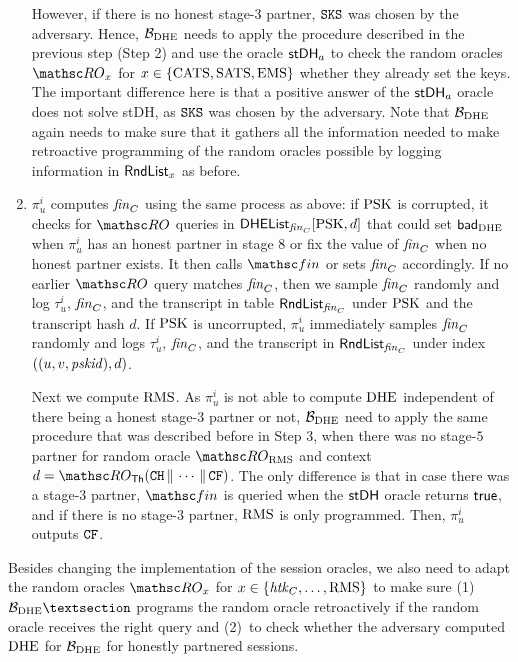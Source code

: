 \begin{enumerate}
		However, if there is no honest stage-$3$ partner, $\mathtt{SKS}$ was chosen by the adversary.
		Hence, $\mathcal{B}_{\mathrm{DHE}}$ needs to apply the procedure described in the previous step (Step 2) and use the oracle $\mathsf{stDH}_a$ to check the random oracles $\RO_{x}$ for $x \in \{\mathrm{CATS}, \mathrm{SATS}, \mathrm{EMS}\}$ whether they already set the keys.
		The important difference here is that a positive answer of the $\mathsf{stDH}_a$ oracle does not solve stDH,
		as $\mathtt{SKS}$ was chosen by the adversary.
		Note that $\mathcal{B}_{\mathrm{DHE}}$ again needs to make sure that it gathers all the information needed to make retroactive programming of the random oracles possible by logging information in $\mathsf{RndList}_{x}$ as before.
		\item $\pi_u^i$ computes $\mathit{fin}_C$ using the same process as above: if $\mathrm{PSK}$ is corrupted, it checks for $\RO$ queries in $\mathsf{DHEList}_{\mathit{fin}_C}[\mathrm{PSK}, d]$ that could set $\mathsf{bad}_{\mathrm{DHE}}$ when $\pi_u^i$ has an honest partner in stage $8$ or fix the value of $\mathit{fin}_C$ when no honest partner exists.
		It then calls $\Finalize$ or sets $\mathit{fin}_C$ accordingly.
		If no earlier $\RO$ query matches $\mathit{fin}_C$, then we sample $\mathit{fin}_C$ randomly and log $\tau_u^i$, $\mathit{fin}_C$, and the transcript in table $\mathsf{RndList}_{\mathit{fin}_C}$ under $\mathrm{PSK}$ and the transcript hash $d$.
		If $\mathrm{PSK}$ is uncorrupted, $\pi_u^i$ immediately samples $\mathit{fin}_C$ randomly and logs $\tau_u^i$, $\mathit{fin}_C$, and the transcript in $\mathsf{RndList}_{\mathit{fin}_C}$ under index $((u,v,\mathit{pskid}), d)$.
		
		Next we compute $\mathrm{RMS}$.
		As $\pi_u^i$ is not able to compute $\mathrm{DHE}$ independent of there being a honest stage-$3$ partner or not, $\mathcal{B}_{\mathrm{DHE}}$ need to apply the same procedure that was described before in Step 3, when there was no stage-$5$ partner for random oracle $\RO_\rms$ and context $d = \RO_\Thash(\CH \concat \dotsb \concat \CF)$.
		The only difference is that in case there was a stage-$3$ partner, $\Finalize$ is queried when the $\mathsf{stDH}$ oracle returns $\mathsf{true}$, and if there is no stage-$3$ partner, $\mathrm{RMS}$ is only programmed.
		Then, $\pi_u^i$ outputs $\mathtt{CF}$.
	\end{enumerate}
	
	Besides changing the implementation of the session oracles, we also need to adapt the random oracles $\RO_x$ for $x \in \{\mathit{htk}_C, \dotsc,\mathrm{RMS}\}$ to make sure
	(1)~$\advB_\dhe§$ programs the random oracle retroactively if the random oracle receives the right query and
	(2)~to check whether the adversary computed $\mathrm{DHE}$ for $\mathcal{B}_{\mathrm{DHE}}$ for honestly partnered sessions.
	
